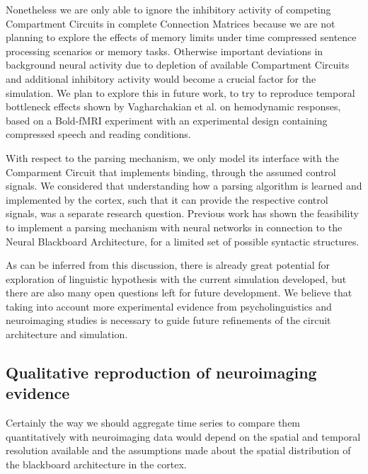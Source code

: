 \documentclass[10pt]{article}
\begin{document}
Nonetheless we are only able to ignore the inhibitory activity of competing Compartment Circuits in complete Connection Matrices because we are not planning to explore the effects of memory limits under time compressed sentence processing scenarios or memory tasks.
Otherwise important deviations in background neural activity due to depletion of available Compartment Circuits and additional inhibitory activity would become a crucial factor for the simulation.
We plan to explore this in future work, to try to reproduce temporal bottleneck effects shown by Vagharchakian et al. on hemodynamic responses, based on a Bold-fMRI experiment with an experimental design containing compressed speech and reading conditions\cite{Vagharchakian_2012}.

With respect to the parsing mechanism, we only model its interface with the Comparment Circuit that implements binding, through the assumed control signals.
We considered that understanding how a parsing algorithm is learned and implemented by the cortex, such that it can provide the respective control signals, was a separate research question.
Previous work has shown the feasibility to implement a parsing mechanism with neural networks in connection to the Neural Blackboard Architecture\cite{van_der_Velde_2010}, for a limited set of possible syntactic structures.

As can be inferred from this discussion, there is already great potential for exploration of linguistic hypothesis with the current simulation developed, but there are also many open questions left for future development.
We believe that taking into account more experimental evidence from psycholinguistics and neuroimaging studies is necessary to guide future refinements of the circuit architecture and simulation.


\subsection{Qualitative reproduction of neuroimaging evidence}



Certainly the way we should aggregate time series to compare them quantitatively with neuroimaging data would depend on the spatial and temporal resolution available and the assumptions made about the spatial distribution of the blackboard architecture in the cortex.
\end{document}
